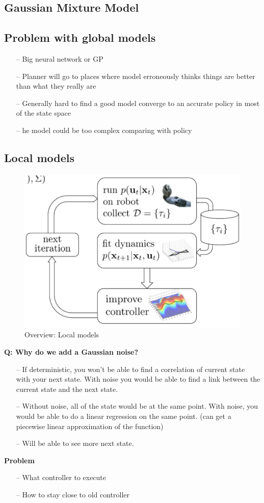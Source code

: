 \documentclass{article}
\begin{document}
\subsection{Gaussian Mixture Model}

\subsection{Problem with global models}
\begin{itemize}
\item[--] Big neural network or GP
\item[--] Planner will go to places where model erroneously thinks things are better than what	they really are
\item[--] Generally hard to find a good model converge to an accurate policy in most of the state space
\item[--] he model could be too complex comparing with policy
\end{itemize}

\subsection{Local models}
\begin{figure}[htp]
    \centering
        \includegraphics[width=0.5\linewidth]{img/localmodels.png}
    \caption{Overview: Local models}
    \label{fig:localmod}
\end{figure}
\textbf{Q: Why do we add a Gaussian noise?}\\
\begin{itemize}
\item[--] If deterministic, you won’t be able to find a correlation of current state with your next state. With noise you would be able to find a link between the current state and the next state.
\item[--] Without noise, all of the state would be at the same point. With noise, you would be able to do a linear regression on the same point. (can get a piecewise linear approximation of the function)
\item[--] Will be able to see more next state.
\end{itemize}
\textbf{Problem}
\begin{itemize}
\item[--] What controller to execute
\item[--] How to stay close to old controller
\end{itemize}
\end{document}
